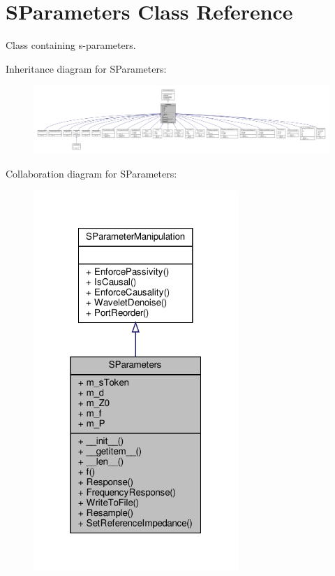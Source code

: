 \hypertarget{classSignalIntegrity_1_1SParameters_1_1SParameters_1_1SParameters}{}\section{S\+Parameters Class Reference}
\label{classSignalIntegrity_1_1SParameters_1_1SParameters_1_1SParameters}


Class containing s-\/parameters.  




Inheritance diagram for S\+Parameters\+:
\nopagebreak
\begin{figure}[H]
\begin{center}
\leavevmode
\includegraphics[width=350pt]{classSignalIntegrity_1_1SParameters_1_1SParameters_1_1SParameters__inherit__graph}
\end{center}
\end{figure}


Collaboration diagram for S\+Parameters\+:
\nopagebreak
\begin{figure}[H]
\begin{center}
\leavevmode
\includegraphics[width=220pt]{classSignalIntegrity_1_1SParameters_1_1SParameters_1_1SParameters__coll__graph}
\end{center}
\end{figure}
